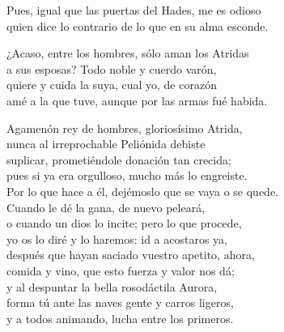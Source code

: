 Pues, igual que las puertas del Hades, me es odioso\\
quien dice lo contrario de lo que en su alma esconde.\par
\poend
\separator
%
\postart
{}
¿Acaso, entre los hombres, sólo aman los Atridas\\
a sus esposas? Todo noble y cuerdo varón,\\
quiere y cuida la suya, cual yo, de corazón\\
amé a la que tuve, aunque por las armas fué habida.\par
\poend
\separator
%
\postart
{}
Agamenón rey de hombres, gloriosísimo Atrida,\\
nunca al irreprochable Peliónida debiste\\
suplicar, prometiéndole donación tan crecida;\\
pues si ya era orgulloso, mucho más lo engreiste.\\
Por lo que hace a él, dejémoslo que se vaya o se quede.\\
Cuando le dé la gana, de nuevo peleará,\\
o cuando un dios lo incite; pero lo que procede,\\
yo os lo diré y lo haremos: id a acostaros ya,\\
después que hayan saciado vuestro apetito, ahora,\\
comida y vino, que esto fuerza y valor nos dá;\\
y al despuntar la bella rosodáctila Aurora,\\
forma tú ante las naves gente y carros ligeros,\\
y a todos animando, lucha entre los primeros.
\poend
\enum